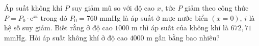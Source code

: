 \begin{ex}%
	Áp suất không khí $P$ suy giảm mũ so với độ cao $x$, tức $P$ giảm theo công thức $P=P_0\cdot \mathrm{e}^{xi}$ trong đó $P_0=760$ mmHg là áp suất ở mực nước biển $(x=0)$, $i$ là hệ số suy giảm. Biết rằng ở độ cao $1000$ m thì áp suất của không khí là $672{,}71$ mmHg. Hỏi áp suất không khí ở độ cao $4000$ m gần bằng bao nhiêu?
\end{ex}
